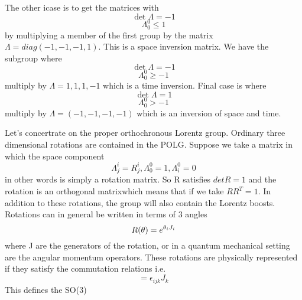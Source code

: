 The other icase is to get the matrices with
\begin{equation}
\det \Lambda = -1
\end{equation}
\begin{equation}
\Lambda^0_0 \le 1
\end{equation}
by multiplying a member of the first group by the matrix $\Lambda = diag (-1, -1 ,-1, 1)$. This
is a space inversion matrix. We have the subgroup where
\begin{equation}
\det \Lambda = -1
\end{equation}
\begin{equation}
\Lambda^0_0 \ge -1
\end{equation}
multiply by $\Lambda = 1, 1, 1, -1$ which is a time inversion. Final
case is where
\begin{equation}
\det \Lambda = 1
\end{equation}
\begin{equation}
\Lambda^0_0 > -1
\end{equation}
multiply by $\Lambda = (-1, -1, -1, -1)$ which is an inversion of
space and time. 

Let's concertrate on the proper orthochronous Lorentz group. Ordinary
three dimensional rotations are contained in the POLG. Suppose we take
a matrix in which the space component 
\begin{equation}
\Lambda^i_j = R^i_j, \Lambda^0_0 = 1, \Lambda^0_i = 0
\end{equation}
in other words is simply a rotation matrix. So R satisfies $det R = 1$
and the rotation is an orthogonal matrixwhich means that if we take $R
R^T = 1$. In addition to these rotations, the group will also contain
the Lorentz boosts. Rotations can in general be written in terms of 3
angles
\begin{equation}
R(\mathbf{\theta}) = e^{\theta_i J_i}
\end{equation}
where J are the generators of the rotation, or in a quantum mechanical
setting are the angular momentum operators. These rotations are
physically represented if they satisfy the commutation relations i.e.
\begin{equation}
[J_i, J_j] = \epsilon_{ijk} J_k
\end{equation}
This defines the SO(3)





